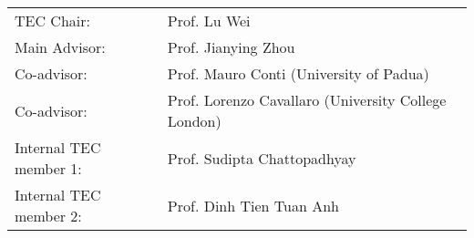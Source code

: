 \documentclass[
11pt, %
oneside, %
english, %
singlespacing, %
headsepline, %
]{MastersDoctoralThesis} %
\begin{document}
\begin{tec}
\addchaptertocentry{\tecname}
\begin{tabular}{ll}
	TEC Chair: & Prof. Lu Wei \\
	Main Advisor: & Prof. Jianying Zhou \\
	Co-advisor: & Prof. Mauro Conti (University of Padua) \\
	Co-advisor: & Prof. Lorenzo Cavallaro (University College London) \\
	Internal TEC member 1: & Prof. Sudipta Chattopadhyay \\
	Internal TEC member 2: & Prof. Dinh Tien Tuan Anh \\
\end{tabular}
\end{tec}
\vfill\eject



%
\end{document}
